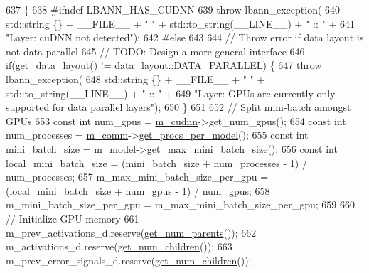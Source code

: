 \begin{DoxyCode}
637                       \{
638 \textcolor{preprocessor}{#ifndef LBANN\_HAS\_CUDNN}
639   \textcolor{keywordflow}{throw} lbann\_exception(
640       std::string \{\} + \_\_FILE\_\_ + \textcolor{stringliteral}{" "} + std::to\_string(\_\_LINE\_\_) + \textcolor{stringliteral}{" :: "} +
641       \textcolor{stringliteral}{"Layer: cuDNN not detected"});
642 \textcolor{preprocessor}{#else}
643 
644   \textcolor{comment}{// Throw error if data layout is not data parallel}
645   \textcolor{comment}{// TODO: Design a more general interface}
646   \textcolor{keywordflow}{if}(\hyperlink{classlbann_1_1Layer_a5dfb66e81fc085997402a5e2241316bd}{get\_data\_layout}() != \hyperlink{base_8hpp_a786677cbfb3f5677b4d84f3056eb08dba37d2a3465f7cbf4ab60f4e79944d0638}{data\_layout::DATA\_PARALLEL}) \{
647     \textcolor{keywordflow}{throw} lbann\_exception(
648       std::string \{\} + \_\_FILE\_\_ + \textcolor{stringliteral}{" "} + std::to\_string(\_\_LINE\_\_) + \textcolor{stringliteral}{" :: "} +
649       \textcolor{stringliteral}{"Layer: GPUs are currently only supported for data parallel layers"});
650   \}
651   
652   \textcolor{comment}{// Split mini-batch amongst GPUs}
653   \textcolor{keyword}{const} \textcolor{keywordtype}{int} num\_gpus = \hyperlink{classlbann_1_1Layer_a08dbb94239e3b8c96329786c57c72e21}{m\_cudnn}->get\_num\_gpus();
654   \textcolor{keyword}{const} \textcolor{keywordtype}{int} num\_processes = \hyperlink{classlbann_1_1Layer_a5de05c52f22e0bbd7c703bec3ad4dbf2}{m\_comm}->\hyperlink{classlbann_1_1lbann__comm_a5755dfdfc6377b4cae5ef8f7819e17de}{get\_procs\_per\_model}();
655   \textcolor{keyword}{const} \textcolor{keywordtype}{int} mini\_batch\_size = \hyperlink{classlbann_1_1Layer_a3d9315e99574166f2f33e37b572021d2}{m\_model}->\hyperlink{classlbann_1_1model_a8c311798ff4acaeafdfbf85162ba5084}{get\_max\_mini\_batch\_size}();
656   \textcolor{keyword}{const} \textcolor{keywordtype}{int} local\_mini\_batch\_size = (mini\_batch\_size + num\_processes - 1) / num\_processes;
657   m\_max\_mini\_batch\_size\_per\_gpu = (local\_mini\_batch\_size + num\_gpus - 1) / num\_gpus;
658   m\_mini\_batch\_size\_per\_gpu = m\_max\_mini\_batch\_size\_per\_gpu;
659 
660   \textcolor{comment}{// Initialize GPU memory}
661   m\_prev\_activations\_d.reserve(\hyperlink{classlbann_1_1Layer_ac9290d4a6453ccda5f6b4d8b57b49ba3}{get\_num\_parents}());
662   m\_activations\_d.reserve(\hyperlink{classlbann_1_1Layer_a1409a117c31a7ea4f2c7a4d22a3e86c3}{get\_num\_children}());
663   m\_prev\_error\_signals\_d.reserve(\hyperlink{classlbann_1_1Layer_a1409a117c31a7ea4f2c7a4d22a3e86c3}{get\_num\_children}());

\end{DoxyCode}
